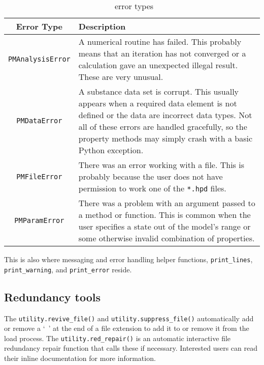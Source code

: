 \begin{table}
\caption{\PM\ error types}\label{tab:errors}
\begin{tabular}{|cp{2.5in}|}
\hline
Error Type & Description\\
\hline
\texttt{PMAnalysisError} & A numerical routine has failed. This probably means that an iteration has not converged or a calculation gave an unexpected illegal result.  These are very unusual.\\
\texttt{PMDataError} & A substance data set is corrupt. This usually appears when a required data element is not defined or the data are incorrect data types.  Not all of these errors are handled gracefully, so the property methods may simply crash with a basic Python exception.\\
\texttt{PMFileError} & There was an error working with a file. This is probably because the user does not have permission to work one of the \texttt{*.hpd} files.\\
\texttt{PMParamError} & There was a problem with an argument passed to a method or function. This is common when the user specifies a state out of the model's range or some otherwise invalid combination of properties.\\
\hline
\end{tabular}
\end{table}

This is also where messaging and error handling helper functions, \texttt{print_lines}, \texttt{print_warning}, and \texttt{print_error} reside.

\subsection{Redundancy tools}

The \texttt{utility.revive_file()} and \texttt{utility.suppress_file()} automatically add or remove a `~' at the end of a file extension to add it to or remove it from the load process.  The \texttt{utility.red_repair()} is an automatic interactive file redundancy repair function that calls these if necessary.  Interested users can read their inline documentation for more information.
